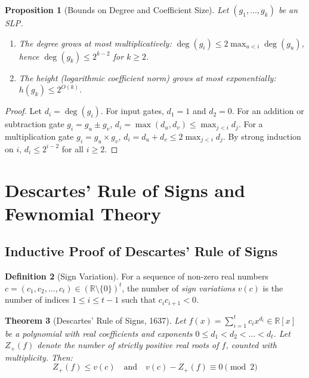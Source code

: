 \documentclass[11pt,a4paper]{article}
\newtheorem{theorem}{Theorem}[section]
\newtheorem{proposition}[theorem]{Proposition}
\theoremstyle{definition}
\newtheorem{definition}[theorem]{Definition}
\begin{document}
\begin{proposition}[Bounds on Degree and Coefficient Size]\label{prop:degree_bounds}
Let $(g_1, \dots, g_k)$ be an SLP.
\begin{enumerate}
    \item The degree grows at most multiplicatively: $\deg(g_i) \le 2 \max_{u < i} \deg(g_u)$, hence $\deg(g_k) \le 2^{k-2}$ for $k \ge 2$.
    \item The height (logarithmic coefficient norm) grows at most exponentially: $h(g_k) \le 2^{O(k)}$.
\end{enumerate}
\end{proposition}

\begin{proof}
Let $d_i = \deg(g_i)$. For input gates, $d_1 = 1$ and $d_2 = 0$.
For an addition or subtraction gate $g_i = g_u \pm g_v$, $d_i = \max(d_u, d_v) \le \max_{j < i} d_j$.
For a multiplication gate $g_i = g_u \times g_v$, $d_i = d_u + d_v \le 2 \max_{j < i} d_j$.
By strong induction on $i$, $d_i \le 2^{i-2}$ for all $i \ge 2$.
\end{proof}

\section{Descartes' Rule of Signs and Fewnomial Theory}

\subsection{Inductive Proof of Descartes' Rule of Signs}

\begin{definition}[Sign Variation]\label{def:sign_variation}
For a sequence of non-zero real numbers $c = (c_1, c_2, \dots, c_t) \in (\mathbb{R} \setminus \{0\})^t$, the number of \emph{sign variations} $v(c)$ is the number of indices $1 \le i \le t - 1$ such that $c_i c_{i+1} < 0$.
\end{definition}

\begin{theorem}[Descartes' Rule of Signs, 1637]\label{thm:descartes_proof}
Let $f(x) = \sum_{i=1}^t c_i x^{d_i} \in \mathbb{R}[x]$ be a polynomial with real coefficients and exponents $0 \le d_1 < d_2 < \dots < d_t$.
Let $Z_+(f)$ denote the number of strictly positive real roots of $f$, counted with multiplicity.
Then:
\begin{equation}\label{eq:descartes_exact}
Z_+(f) \le v(c) \quad \text{and} \quad v(c) - Z_+(f) \equiv 0 \pmod 2
\end{equation}
\end{theorem}
\end{document}

